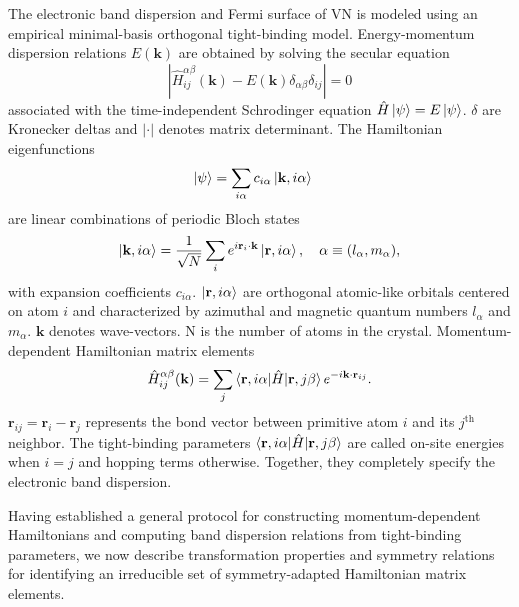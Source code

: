 \documentclass[twocolumn,showpacs,preprintnumbers,superscriptaddress,prb,floatfix,aps,10pt]{revtex4-1}
\renewcommand{\vec}[1]{\ensuremath{\mathbf{#1}}}
\newcommand*{\ham}{\hat{H}}
\newcommand*{\bloch}{\ket{\vec{k}, i\alpha}}
\newcommand*{\lowdin}{\ket{\vec{r}, i\alpha}}
\newcommand*{\bondvec}{\vec{r}_{ij}}
\begin{document}
The electronic band dispersion and Fermi surface of VN is modeled using an empirical minimal-basis orthogonal tight-binding model. Energy-momentum dispersion relations $E(\vec{k})$ are obtained by solving the secular equation
\begin{equation}
\label{eq:secular}
\left| \ham^{\alpha\beta}_{ij}(\vec{k}) - E(\vec{k})\delta_{\alpha\beta}\delta_{ij} \right| = 0
\end{equation}
%
associated with the time-independent Schrodinger equation $\hat{H} \ket{\psi} = E \ket{\psi}$. $\delta$ are Kronecker deltas and $|\cdot |$ denotes matrix determinant. The Hamiltonian eigenfunctions
\begin{align}
\label{eq:statevec}
\ket{\psi}  &= \sum_{i\alpha} c_{i\alpha} \bloch
\end{align}
%
are linear combinations of periodic Bloch states 
\begin{equation}
\label{eq:bloch}
\bloch = \frac{1}{\sqrt{N}} \sum_i e^{i\vec{r}_i\cdot\vec{k}} \lowdin, 
\quad
\alpha \equiv (l_\alpha,m_\alpha),
\end{equation}
%
with expansion coefficients $c_{i\alpha}$. $\lowdin$ are orthogonal atomic-like orbitals centered on atom $i$ and characterized by azimuthal and magnetic quantum numbers $l_\alpha$ and $m_\alpha$. $\vec{k}$ denotes wave-vectors. N is the number of atoms in the crystal. Momentum-dependent Hamiltonian matrix elements
\begin{align}
\label{eq:matrix_element}
\ham^{\alpha\beta}_{ij}(\vec{k}) = \sum_j \braket{\vec{r},i\alpha | \ham | \vec{r},j\beta} e^{-i \vec{k}\cdot\vec{r}_{ij}} .
\end{align}
%
$\bondvec = \vec{r}_i - \vec{r}_j$ represents the bond vector between primitive atom $i$ and its $j^{\textrm{th}}$ neighbor. The tight-binding parameters $\braket{\vec{r},i\alpha | \ham | \vec{r},j\beta}$ are called on-site energies when $i=j$ and hopping terms otherwise. Together, they completely specify the electronic band dispersion.  

Having established a general protocol for constructing momentum-dependent Hamiltonians and computing band dispersion relations from tight-binding parameters, we now describe transformation properties and symmetry relations for identifying an irreducible set of symmetry-adapted Hamiltonian matrix elements. 
\end{document}

